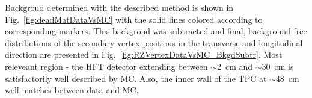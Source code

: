Backgroud determined with the described method is shown in Fig.~\ref{fig:deadMatDataVsMC} with the solid lines colored according to corresponding markers. This backgroud was subtracted and final, background-free distributions of the secondary vertex positions in the transverse and longitudinal direction are presented in Fig.~\ref{fig:RZVertexDataVsMC_BkgdSubtr}. Most releveant region - the HFT detector extending between $\sim$2~cm and $\sim$30~cm is satisfactorily well described by MC. Also, the inner wall of the TPC at $\sim$48~cm well matches between data and MC.



\begin{figure}[hb]
\centering
\parbox{0.4725\textwidth}{
  \centering
  \begin{subfigure}[b]{\linewidth}
                \vspace{-5pt}
  \end{subfigure}
}%
\quad\quad%
\parbox{0.4725\textwidth}{
  \centering
  \begin{subfigure}[b]{\linewidth}
                \vspace{-5pt}

\end{subfigure}}
\end{figure}
